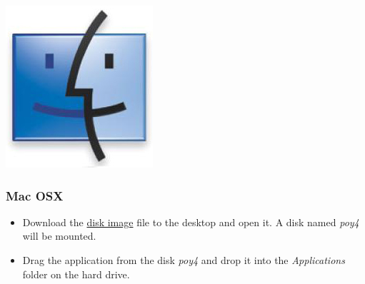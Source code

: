 \begin{flushleft}
	\begin{minipage}[c]{0.074\textwidth}
   		\includegraphics[width=\textwidth]{figures/figLogoMac.jpg}
	\end{minipage}
	\quad
	\begin{minipage}[t]{0.88\textwidth}
	   	\subsubsection{Mac OSX}
	\end{minipage}
	            \begin{itemize}
			\item Download the
            \href{http://research.amnh.org/scicomp/projects/poy.php}{disk
            image} file to the desktop and open it. A disk named \emph{poy4} will be
            mounted.
            		\item Drag the \poy application from the
            disk \emph{poy4} and drop it into the \emph{Applications}
            folder on the hard drive.
		\end{itemize}


\end{flushleft}
